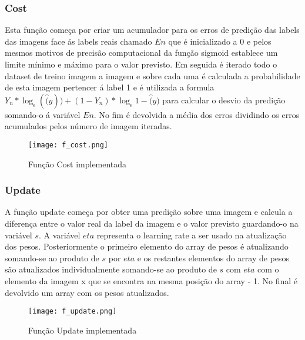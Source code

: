 \subsubsection{Cost}\hfill\newline
	\hfill\newline
	Esta função começa por criar um acumulador para os erros de predição das labels das imagens face ás labels reais chamado $En$ que é inicializado a 0 e pelos mesmos motivos de precisão computacional da função sigmoid establece um limite mínimo e máximo para o valor previsto.\newline
	Em seguida é iterado todo o dataset de treino imagem a imagem e sobre cada uma é calculada a probabilidade de esta imagem pertencer á label 1 e é utilizada a formula $Y_n*\log_\epsilon(\hat(y))+(1-Y_n)*\log_\epsilon{1-\hat(y)}$ para calcular o desvio da predição somando-o á variável $En$.\newline
	No fim é devolvida a média dos erros dividindo os erros acumulados pelos número de imagem iteradas.

	\begin{figure}[H]

	  \centering
	  \captionsetup{justification=centering}

	  \texttt{[image: f\_cost.png]}
	  
	  \caption {Função Cost implementada}
	\end{figure}


\subsubsection{Update}\hfill\newline
	\hfill\newline
	A função update começa por obter uma predição sobre uma imagem e calcula a diferença entre o valor real da label da imagem e o valor previsto guardando-o na variável $s$. A variável $eta$ representa o learning rate a ser usado na atualização dos pesos.\newline
	 Posteriormente o primeiro elemento do array de pesos é atualizando somando-se ao produto de $s$ por $eta$ e os restantes elementos do array de pesos são atualizados individualmente somando-se ao produto de $s$ com $eta$ com o elemento da imagem x que se encontra na mesma posição do array - 1.\newline
	No final é devolvido um array com os pesos atualizados.

	\begin{figure}[H]

	  \centering
	  \captionsetup{justification=centering}

	  \texttt{[image: f\_update.png]}
	  
	  \caption {Função Update implementada}
	\end{figure}



